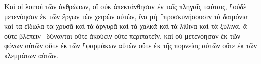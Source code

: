 \documentclass{openreader}
\begin{document}
Καὶ οἱ λοιποὶ τῶν ἀνθρώπων, οἳ οὐκ ἀπεκτάνθησαν ἐν ταῖς πληγαῖς ταύταις, ⸀οὐδὲ μετενόησαν ἐκ τῶν ἔργων τῶν χειρῶν αὐτῶν, ἵνα μὴ ⸀προσκυνήσουσιν τὰ δαιμόνια καὶ τὰ εἴδωλα τὰ χρυσᾶ καὶ τὰ ἀργυρᾶ καὶ τὰ χαλκᾶ καὶ τὰ λίθινα καὶ τὰ ξύλινα, ἃ οὔτε βλέπειν ⸀δύνανται οὔτε ἀκούειν οὔτε περιπατεῖν, 
καὶ οὐ μετενόησαν ἐκ τῶν φόνων αὐτῶν οὔτε ἐκ τῶν ⸀φαρμάκων αὐτῶν οὔτε ἐκ τῆς πορνείας αὐτῶν οὔτε ἐκ τῶν κλεμμάτων αὐτῶν. 
\end{document}
